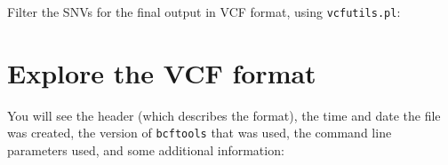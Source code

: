 \documentclass[
  letterpaper,
  DIV=11,
  numbers=noendperiod]{scrreprt}
\newenvironment{Shaded}{\begin{snugshade}}{\end{snugshade}}
\newcommand{\AttributeTok}[1]{\textcolor[rgb]{0.40,0.45,0.13}{#1}}
\newcommand{\ExtensionTok}[1]{\textcolor[rgb]{0.00,0.23,0.31}{#1}}
\newcommand{\NormalTok}[1]{\textcolor[rgb]{0.00,0.23,0.31}{#1}}
\newcommand{\OperatorTok}[1]{\textcolor[rgb]{0.37,0.37,0.37}{#1}}
\begin{document}
Filter the SNVs for the final output in VCF format, using
\texttt{vcfutils.pl}:

\begin{Shaded}
\end{Shaded}

\hypertarget{explore-the-vcf-format}{%
\section{Explore the VCF format}\label{explore-the-vcf-format}}

\begin{Shaded}
\end{Shaded}

You will see the header (which describes the format), the time and date
the file was created, the version of \texttt{bcftools} that was used,
the command line parameters used, and some additional information:
\end{document}
